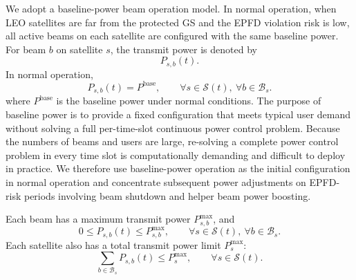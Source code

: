 We adopt a baseline-power beam operation model. In normal operation, when LEO satellites are far from the protected GS and the EPFD violation risk is low, all active beams on each satellite are configured with the same baseline power. For beam $b$ on satellite $s$, the transmit power is denoted by
\begin{equation*}
P_{s,b}(t).
\end{equation*}
In normal operation,
\begin{equation*}
P_{s,b}(t)=P^{\mathrm{base}},\qquad \forall s\in\mathcal{S}(t),\ \forall b\in\mathcal{B}_s.
\end{equation*}
where $P^{\mathrm{base}}$ is the baseline power under normal conditions. The purpose of baseline power is to provide a fixed configuration that meets typical user demand without solving a full per-time-slot continuous power control problem. Because the numbers of beams and users are large, re-solving a complete power control problem in every time slot is computationally demanding and difficult to deploy in practice. We therefore use baseline-power operation as the initial configuration in normal operation and concentrate subsequent power adjustments on EPFD-risk periods involving beam shutdown and helper beam power boosting.

Each beam has a maximum transmit power $P_{s,b}^{\max}$, and
\begin{equation}
0\le P_{s,b}(t)\le P_{s,b}^{\max},\qquad \forall s\in\mathcal{S}(t),\ \forall b\in\mathcal{B}_s.
\label{eq:ch3_beam_power_cap}
\end{equation}
Each satellite also has a total transmit power limit $P_s^{\max}$:
\begin{equation}
\sum_{b\in\mathcal{B}_s} P_{s,b}(t)\le P_s^{\max},\qquad \forall s\in\mathcal{S}(t).
\label{eq:ch3_sat_power_budget}
\end{equation}

